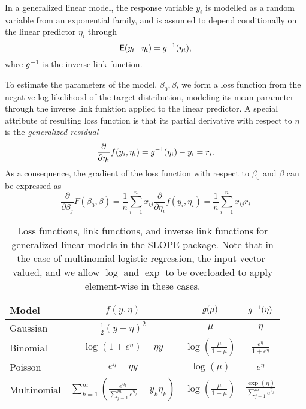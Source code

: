 \documentclass[article]{jss}
\begin{document}
In a generalized linear model, the response variable \(y_i\) is modelled
as a random variable from an exponential family, and is assumed to depend
conditionally on the linear predictor \(\eta_i\) through
\[
  \mathsf{E}(y_i \mid \eta_i) = g^{-1}(\eta_i),
\]
whee \(g^{-1}\) is the inverse link function.

To estimate the parameters of the model, \(\beta_0, \beta\), we form a loss
function from the negative log-likelihood of the target distribution, modeling
its mean parameter through the inverse link funktion applied to the linear
predictor. A special attribute of resulting loss function is that its partial
derivative with respect to \(\eta\) is the
\emph{generalized residual}
\[
  \frac{\partial}{\partial \eta_i} f(y_i, \eta_i) = g^{-1}(\eta_i) - y_i = r_i.
\]
As a consequence, the gradient of the loss function with respect to \(\beta_0\)
and \(\beta\) can be expressed as
\[
  \frac{\partial}{\partial \beta_j} F(\beta_0,\beta)
  = \frac{1}{n} \sum_{i=1}^n x_{ij} \frac{\partial}{\partial \eta_i} f(y_i, \eta_i)
  = \frac{1}{n} \sum_{i=1}^n x_{ij} r_i
\]

\begin{table}[htpb]
  \centering
  \caption{Loss functions, link functions, and inverse link functions for
    generalized linear models in the SLOPE package. Note that in the case of
    multinomial logistic regression, the input vector-valued, and we allow
    \(\log\) and \(\exp\) to be overloaded to apply element-wise in these cases.
  }
  \label{tab:glm}
  \begin{tabular}{lccc}
    \toprule
    Model       & \(f(y, \eta)\)                                                                          & \(g(\mu)\)                            & \(g^{-1}(\eta)\)                               \\
    \midrule
    Gaussian    & \(\frac{1}{2}(y - \eta)^2\)                                                             & \(\mu\)                                   & \(\eta\)                                       \\
    \addlinespace
    Binomial    & \(\log(1 + e^\eta) - \eta y\)                                                           & \(\log \left(\frac{\mu}{1 - \mu}\right)\) & \(\frac{e^\eta}{1 + e^\eta}\)                  \\
    \addlinespace
    Poisson     & \(e^\eta - \eta y\)                                                                     & \(\log(\mu)\)                             & \(e^\eta\)                                     \\
    \addlinespace
    Multinomial & \(\sum_{k=1}^m\left( \frac{e^{\eta_k}}{\sum_{j=1}^m e^{\eta_j}} - y_k \eta_k  \right)\) & \(\log\left(\frac{\mu}{1 - \mu}\right) \) & \(\frac{\exp(\eta)}{\sum_{j=1}^m e^{\eta_j}}\) \\
    \bottomrule
  \end{tabular}
\end{table}
\end{document}
